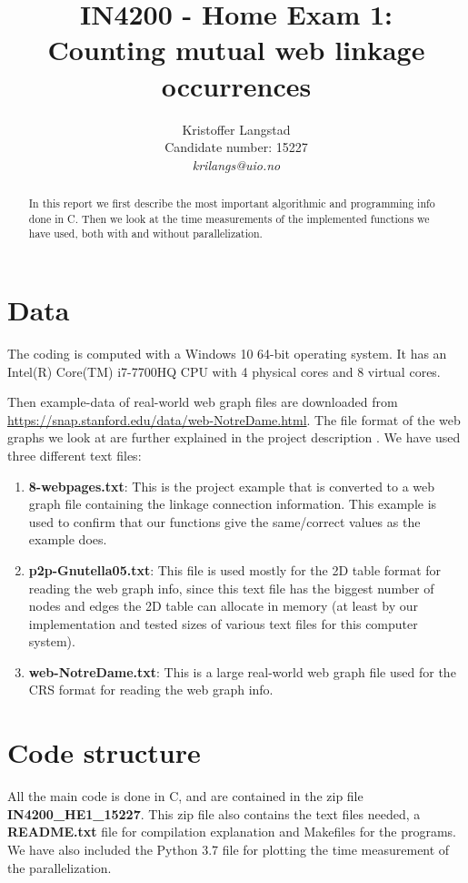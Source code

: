 \documentclass[12pt,a4paper,english]{article}
\title{IN4200 - Home Exam 1:\\ Counting mutual web linkage occurrences}
\date{}
\author{ Kristoffer Langstad\\ Candidate number: 15227\\ \textit{krilangs@uio.no}}
\begin{document}
\maketitle
\begin{abstract}
	In this report we first describe the most important algorithmic and programming info done in C. Then we look at the time measurements of the implemented functions we have used, both with and without parallelization.
\end{abstract}

\section{Data}
\label{sect:Data}
The coding is computed with a Windows 10 64-bit operating system. It has an Intel(R) Core(TM) i7-7700HQ CPU with 4 physical cores and 8 virtual cores.

Then example-data of real-world web graph files are downloaded from \url{https://snap.stanford.edu/data/web-NotreDame.html}. The file format of the web graphs we look at are further explained in the project description \cite{IN4200}. We have used three different text files:
\begin{enumerate}
	\item \textbf{8-webpages.txt}: This is the project example that is converted to a web graph file containing the linkage connection information. This example is used to confirm that our functions give the same/correct values as the example does.
	\item \textbf{p2p-Gnutella05.txt}: This file is used mostly for the 2D table format for reading the web graph info, since this text file has the biggest number of nodes and edges the 2D table can allocate in memory (at least by our implementation and tested sizes of various text files for this computer system).
	\item \textbf{web-NotreDame.txt}: This is a large real-world web graph file used for the CRS format for reading the web graph info.
\end{enumerate} 

\section{Code structure}
\label{sect:Code_struct}
All the main code is done in C, and are contained in the zip file \textbf{IN4200\_HE1\_15227}. This zip file also contains the text files needed, a \textbf{README.txt} file for compilation explanation and Makefiles for the programs. We have also included the Python 3.7 file for plotting the time measurement of the parallelization.
\end{document}
